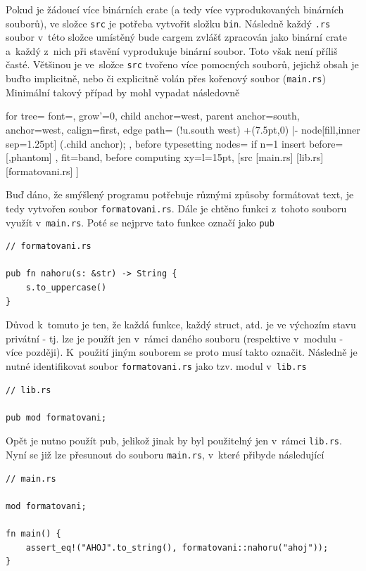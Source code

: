 \documentclass[a4paper, 12pt, twoside]{article} %
\newcommand{\rust}[1]{\texttt{#1}}
\begin{document}
		Pokud je žádoucí více binárních crate (a tedy více vyprodukovaných binárních souborů), ve složce \texttt{src} je potřeba vytvořit složku \texttt{bin}. Následně každý \texttt{.rs} soubor v~této složce umístěný bude cargem zvlášť zpracován jako binární crate a~každý z~nich při stavění vyprodukuje binární soubor. Toto však není příliš časté. Většinou je ve~složce \texttt{src} tvořeno více pomocných souborů, jejichž obsah je buďto implicitně, nebo či explicitně volán přes kořenový soubor (\texttt{main.rs}) Minimální takový případ by mohl vypadat následovně

		\begin{center}
			\begin{forest}
				for tree={
				font=\ttfamily,
				grow'=0,
				child anchor=west,
				parent anchor=south,
				anchor=west,
				calign=first,
				edge path={
					\noexpand{}
					(!u.south west) +(7.5pt,0) |- node[fill,inner sep=1.25pt] {} (.child anchor);
				},
				before typesetting nodes={
					if n=1
					{insert before={[,phantom]}}
					{}
				},
				fit=band,
				before computing xy={l=15pt},
				}
			[src
				[main.rs]
				[lib.rs]
				[formatovani.rs]
			]
			\end{forest}
		\end{center}
		
		Buď dáno, že smýšlený programu potřebuje různými způsoby formátovat text, je tedy vytvořen soubor \texttt{formatovani.rs}. Dále je chtěno funkci z~tohoto souboru využít v~\texttt{main.rs}. Poté se nejprve tato funkce označí jako \rust{pub}
		\begin{verbatim}
// formatovani.rs

pub fn nahoru(s: &str) -> String {
	s.to_uppercase()
}
		\end{verbatim}

		Důvod k~tomuto je ten, že každá funkce, každý struct, atd. je ve výchozím stavu privátní - tj. lze je použít jen v~rámci daného souboru (respektive v~modulu - více později). K~použití jiným souborem se proto musí takto označit. Následně je nutné identifikovat soubor \texttt{formatovani.rs} jako tzv. modul v~\texttt{lib.rs}
		\begin{verbatim}
// lib.rs

pub mod formatovani;
		\end{verbatim}
		
		Opět je nutno použít pub, jelikož jinak by byl použitelný jen v~rámci \texttt{lib.rs}. Nyní se již lze přesunout do souboru \texttt{main.rs}, v~které přibyde následující
		\begin{verbatim}
// main.rs

mod formatovani;

fn main() {
	assert_eq!("AHOJ".to_string(), formatovani::nahoru("ahoj"));    
}
		\end{verbatim}
		
\end{document}
